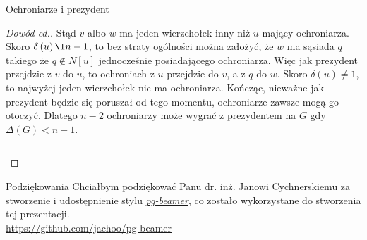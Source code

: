 \documentclass[polish]{beamer}
\begin{document}
\begin{frame}{Ochroniarze i prezydent}
    \begin{proof}[Dowód cd.]
        Stąd $v$ albo $w$ ma jeden wierzchołek inny niż $u$ mający ochroniarza.\\
        Skoro $\delta\left(u\right)\l n-1$, to bez straty ogólności można założyć, 
        że $w$ ma sąsiada $q$ takiego że $q\notin N\left[u\right]$ jednocześnie posiadającego ochroniarza.
        Więc jak prezydent przejdzie z $v$ do $u$, to ochroniach z $u$ przejdzie do $v$, a z $q$ do $w$. 
        Skoro $\delta\left(u\right)\ne 1$, to najwyżej jeden wierzchołek nie ma ochroniarza. 
        Kończąc, nieważne jak prezydent będzie się poruszał od tego momentu, ochroniarze zawsze mogą go otoczyć.
        Dlatego $n-2$ ochroniarzy może wygrać z prezydentem na $G$ gdy $\Delta\left(G\right)<n-1$.
        \begin{example}
            \begin{columns}
                    \centering
            \end{columns}
        \end{example}  
    \end{proof}
\end{frame}

\begin{frame}{Podziękowania}
    Chciałbym podziękować Panu dr. inż. Janowi Cychnerskiemu za stworzenie 
    i udostępnienie stylu \href{https://github.com/jachoo/pg-beamer}{\emph{pg-beamer}}, 
    co zostało wykorzystane do stworzenia tej prezentacji.\\
    \url{https://github.com/jachoo/pg-beamer}
     
\end{frame}
\end{document}
